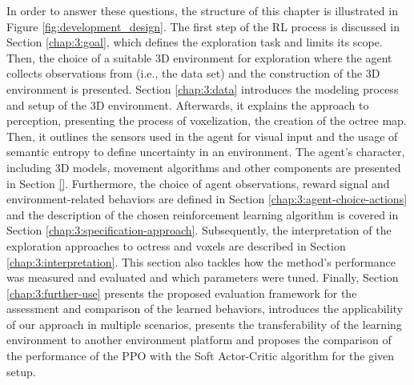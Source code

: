 In order to answer these questions, the structure of this chapter is illustrated in Figure \ref{fig:development_design}.
The first step of the RL process is discussed in Section \ref{chap:3:goal}, which defines the exploration task and limits its scope. 
Then, the choice of a suitable 3D environment for exploration where the agent collects observations from (i.e., the data set) and the construction of the 3D environment is presented. 
Section \ref{chap:3:data} introduces the modeling process and setup of the 3D environment.
Afterwards, it explains the approach to perception, presenting the process of voxelization, the creation of the octree map.
Then, it outlines the sensors used in the agent for visual input and the usage of semantic entropy to define uncertainty in an environment.
% 
The agent's character, including 3D models, movement algorithms and other components are presented in Section \ref{}.
Furthermore, the choice of agent observations, reward signal and environment-related behaviors are defined in Section \ref{chap:3:agent-choice-actions} and the description of the chosen reinforcement learning algorithm is covered in Section \ref{chap:3:specification-approach}. Subsequently, the interpretation of the exploration approaches to octress and voxels are described in Section \ref{chap:3:interpretation}. 
This section also tackles how the method's performance was measured and evaluated and which parameters were tuned.
Finally, Section \ref{chap:3:further-use} presents the proposed evaluation framework for the assessment and comparison of the learned behaviors, introduces the applicability of our approach in multiple scenarios, presents the transferability of the learning environment to another environment platform and proposes the comparison of the performance of the PPO with the Soft Actor-Critic algorithm for the given setup.
